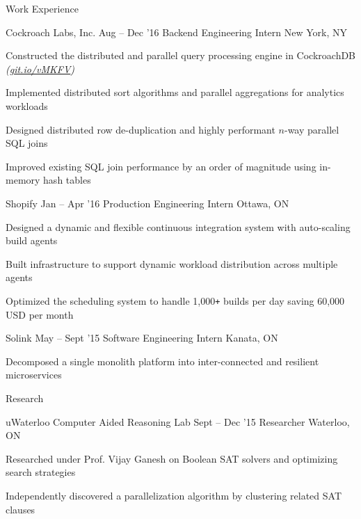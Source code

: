 \documentclass{resume} %
\begin{document}
\begin{rSection}{Work Experience}
  \begin{rSubsection}{Cockroach Labs, Inc.}
                     {Aug -- Dec '16}
                     {Backend Engineering Intern}
                     {New York, NY}

    \item Constructed the distributed and parallel query processing engine in
      CockroachDB {\em (\href{https://git.io/vMKFV}{git.io/vMKFV})}
    \item Implemented distributed sort algorithms and parallel aggregations for
      analytics workloads
    \item Designed distributed row de-duplication and highly performant $n$-way
      parallel SQL joins
    \item Improved existing SQL join performance by an order of magnitude using
      in-memory hash tables
  \end{rSubsection}

  \begin{rSubsection}{Shopify}
                     {Jan -- Apr '16}
                     {Production Engineering Intern}
                     {Ottawa, ON}

  \item Designed a dynamic and flexible continuous integration system with
    auto-scaling build agents
  \item Built infrastructure to support dynamic workload distribution across
    multiple agents
  \item Optimized the scheduling system to handle 1,000\texttt{+} builds per
    day saving 60,000 USD per month
  \end{rSubsection}

  \begin{rSubsection}{Solink}
                     {May -- Sept '15}
                     {Software Engineering Intern}
                     {Kanata, ON}

    \item Decomposed a single monolith platform into inter-connected and
      resilient microservices
  \end{rSubsection}
\end{rSection}


\begin{rSection}{Research}
  \begin{rSubsection}{uWaterloo Computer Aided Reasoning Lab}
                     {Sept -- Dec '15}
                     {Researcher}
                     {Waterloo, ON}
    \item Researched under Prof. Vijay Ganesh on Boolean SAT solvers and
      optimizing search strategies
    \item Independently discovered a parallelization algorithm by clustering
      related SAT clauses
  \end{rSubsection}
\end{rSection}
\end{document}
